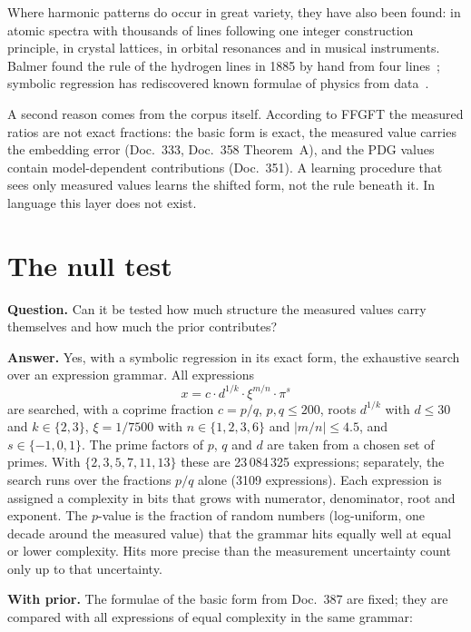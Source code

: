 Where harmonic patterns do occur in great variety, they have also been found: in atomic spectra with
thousands of lines following one integer construction principle, in crystal lattices, in orbital
resonances and in musical instruments. Balmer found the rule of the hydrogen lines in 1885 by hand
from four lines \QM\,\cite{Balmer1885}; symbolic regression has rediscovered known formulae of physics
from data \QM\,\cite{Udrescu2020}.

A second reason comes from the corpus itself. According to FFGFT the measured ratios are not exact
fractions: the basic form is exact, the measured value carries the embedding error (Doc.~333,
Doc.~358 Theorem~A), and the PDG values contain model-dependent contributions (Doc.~351). A learning
procedure that sees only measured values learns the shifted form, not the rule beneath it. In
language this layer does not exist.

\section{The null test}
\label{sec:nulltest}

\textbf{Question.} Can it be tested how much structure the measured values carry themselves and how
much the prior contributes?

\textbf{Answer.} Yes, with a symbolic regression in its exact form, the exhaustive search over an
expression grammar. All expressions
\[
  x=c\cdot d^{1/k}\cdot\xi^{m/n}\cdot\pi^{s}
\]
are searched, with a coprime fraction $c=p/q$, $p,q\le200$, roots $d^{1/k}$ with $d\le30$ and
$k\in\{2,3\}$, $\xi=1/7500$ with $n\in\{1,2,3,6\}$ and $|m/n|\le4.5$, and $s\in\{-1,0,1\}$. The prime
factors of $p$, $q$ and $d$ are taken from a chosen set of primes. With $\{2,3,5,7,11,13\}$ these are
23\,084\,325 expressions; separately, the search runs over the fractions $p/q$ alone (3109
expressions). Each expression is assigned a complexity in bits that grows with numerator,
denominator, root and exponent. The $p$-value is the fraction of random numbers (log-uniform, one
decade around the measured value) that the grammar hits equally well at equal or lower complexity.
Hits more precise than the measurement uncertainty count only up to that uncertainty.

\textbf{With prior.} The formulae of the basic form from Doc.~387 are fixed; they are compared with
all expressions of equal complexity in the same grammar:

